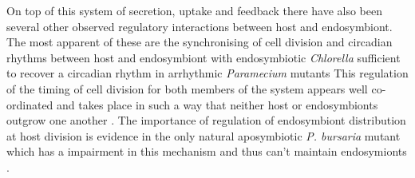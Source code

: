 On top of this system of secretion, uptake and feedback there have also been several other observed regulatory interactions between host and endosymbiont.  
The most apparent of these are the synchronising of cell division and circadian rhythms between host and endosymbiont with endosymbiotic \textit{Chlorella} sufficient to recover a circadian rhythm in arrhythmic \textit{Paramecium} mutants \citep{Miwa2009}
This regulation of the timing of cell division for both members of the system appears well co-ordinated and takes place in such a way that neither host or endosymbionts outgrow one another \citep{Kadono2004,Takahashi2007}.
The importance of regulation of endosymbiont distribution at host division is evidence in the only natural aposymbiotic \textit{P. bursaria} mutant which
has a impairment in this mechanism and thus can't maintain endosymionts \citep{Tonooka2002}. %


%
%



